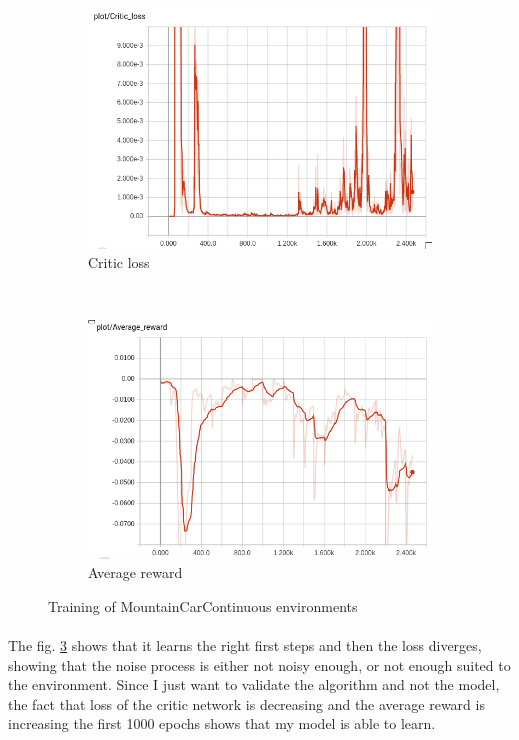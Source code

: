 \documentclass{article}
\begin{document}
\begin{figure}[ht]
  \begin{subfigure}[t]{.5\textwidth}
    \centering
    \includegraphics[width=1.\textwidth]{critic_mountain}
    \caption{Critic loss}
    \label{fig:criticlossmountain}
  \end{subfigure}%
  ~
  \begin{subfigure}[t]{.5\textwidth}
    \centering
    \includegraphics[width=1.\textwidth]{avg_reward_mountain}
    \caption{Average reward}
    \label{fig:avgrewardmountain}
  \end{subfigure}
  \caption{Training of MountainCarContinuous environments}
  \label{fig:mountaincartrain}
\end{figure}

\paragraph{}
The fig. \ref{fig:mountaincartrain} shows that it learns the right first steps
and then the loss diverges, showing that the noise process is either not noisy
enough, or not enough suited to the environment. Since I just want to validate
the algorithm and not the model, the fact that loss of the critic network is
decreasing and the average reward is increasing the first 1000 epochs shows that
my model is able to learn.
\end{document}
